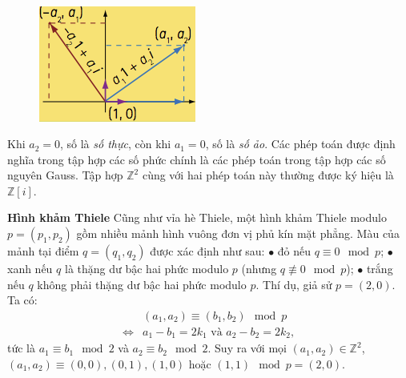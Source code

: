 \begin{multicols}{2}
\begin{tBox}
\begin{align*}
		\end{align*}
		\begin{figure}
			\vspace*{-15pt}
			\centering
			\captionsetup{labelformat= empty, justification=centering}
			\hspace*{-12pt}\includegraphics[width= 1.1\linewidth]{mosaique-7.png}
			\vspace*{-15pt}
		\end{figure}
		Khi $a_2 = 0$, số là {\em số thực}, còn khi $a_1 = 0$, số là {\em số ảo}.
		Các phép toán được định nghĩa trong tập hợp các số phức chính là các phép toán trong tập hợp các số nguyên Gauss. Tập hợp $\mathbb Z^2$ cùng với hai phép toán này thường được ký hiệu là $\mathbb Z[i]$.
	\end{tBox}
	\vskip 0.1cm
	\textbf{\color{toanhocdoisong}Hình khảm Thiele}
	\vskip 0.1cm
	Cũng như vỉa hè Thiele, một hình khảm Thiele modulo $p = (p_1, p_2)$ gồm nhiều mảnh hình vuông đơn vị phủ kín mặt phẳng. Màu của mảnh tại điểm $q = (q_1, q_2)$ được xác định như sau:
	\vskip 0.1cm
	$\bullet$	đỏ nếu $q \equiv 0 \mod{p}$;
	\vskip 0.1cm
	$\bullet$	xanh nếu $q$ là thặng dư bậc hai phức modulo $p$ (nhưng $q \not\equiv 0 \mod{p}$);
	\vskip 0.1cm
	$\bullet$	trắng nếu $q$ không phải thặng dư bậc hai phức modulo $p$.
	\vskip 0.1cm
	Thí dụ, giả sử $p = (2, 0)$. Ta có:
	\begin{align*}
		&(a_1, a_2) \equiv (b_1, b_2) \mod{p} \\
		\iff& a_1 - b_1 = 2 k_1 \mbox{ và } a_2 - b_2 = 2 k_2,
	\end{align*}
	tức là $a_1 \equiv b_1 \mod{2}$ và $a_2 \equiv b_2 \mod{2}$. Suy ra với mọi $(a_1, a_2) \in \mathbb Z^2$, $(a_1, a_2) \equiv (0, 0), (0, 1), (1, 0)$ hoặc $(1, 1) \mod{p = (2, 0)}$.

\end{multicols}
